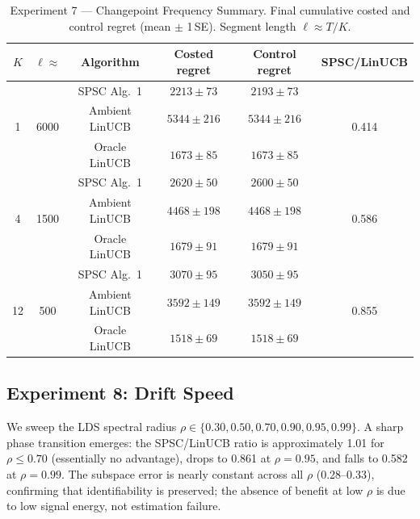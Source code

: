\documentclass{article}
\begin{document}
\begin{table}[!htpb]
  \centering
  \caption{Experiment 7 --- Changepoint Frequency Summary.
    Final cumulative costed and control regret (mean $\pm$ 1\,SE).
    Segment length $\ell \approx T/K$.}
  \label{tab:exp7}
  \small
  \setlength{\tabcolsep}{4pt}
  \begin{tabular}{cccccc}
    \toprule
    $K$ & $\ell \approx$ & Algorithm & Costed regret & Control regret & SPSC/LinUCB \\
    \midrule
    \multirow{3}{*}{1} & \multirow{3}{*}{6000}
      & SPSC Alg.\ 1   & $2213 \pm 73$  & $2193 \pm 73$  & \multirow{3}{*}{0.414} \\
      & & Ambient LinUCB & $5344 \pm 216$ & $5344 \pm 216$ & \\
      & & Oracle LinUCB  & $1673 \pm 85$  & $1673 \pm 85$  & \\
    \midrule
    \multirow{3}{*}{4} & \multirow{3}{*}{1500}
      & SPSC Alg.\ 1   & $2620 \pm 50$  & $2600 \pm 50$  & \multirow{3}{*}{0.586} \\
      & & Ambient LinUCB & $4468 \pm 198$ & $4468 \pm 198$ & \\
      & & Oracle LinUCB  & $1679 \pm 91$  & $1679 \pm 91$  & \\
    \midrule
    \multirow{3}{*}{12} & \multirow{3}{*}{500}
      & SPSC Alg.\ 1   & $3070 \pm 95$  & $3050 \pm 95$  & \multirow{3}{*}{0.855} \\
      & & Ambient LinUCB & $3592 \pm 149$ & $3592 \pm 149$ & \\
      & & Oracle LinUCB  & $1518 \pm 69$  & $1518 \pm 69$  & \\
    \bottomrule
  \end{tabular}
\end{table}

\subsection{Experiment 8: Drift Speed}

We sweep the LDS spectral radius $\rho \in \{0.30, 0.50, 0.70, 0.90, 0.95, 0.99\}$.
A sharp phase transition emerges: the SPSC/LinUCB ratio is approximately 1.01 for $\rho \le 0.70$ (essentially no advantage), drops to 0.861 at $\rho{=}0.95$, and falls to 0.582 at $\rho{=}0.99$.
The subspace error is nearly constant across all $\rho$ (0.28--0.33), confirming that identifiability is preserved; the absence of benefit at low $\rho$ is due to low signal energy, not estimation failure.
\end{document}
